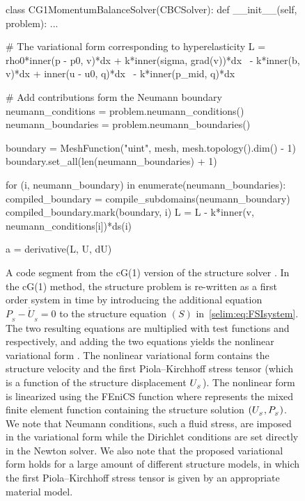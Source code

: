 \begin{figure}[tbp!]
\begin{python}
class CG1MomentumBalanceSolver(CBCSolver):
    def __init__(self, problem):
        ...

        # The variational form corresponding to hyperelasticity
        L = rho0*inner(p - p0, v)*dx + k*inner(sigma, grad(v))*dx \
          - k*inner(b, v)*dx + inner(u - u0, q)*dx \
          - k*inner(p_mid, q)*dx

        # Add contributions form the Neumann boundary
        neumann_conditions = problem.neumann_conditions()
        neumann_boundaries = problem.neumann_boundaries()

        boundary = MeshFunction("uint", mesh, mesh.topology().dim() - 1)
        boundary.set_all(len(neumann_boundaries) + 1)

        for (i, neumann_boundary) in enumerate(neumann_boundaries):
            compiled_boundary = compile_subdomains(neumann_boundary)
            compiled_boundary.mark(boundary, i)
            L = L - k*inner(v, neumann_conditions[i])*ds(i)

        a = derivative(L, U, dU)
\end{python}
\caption{A code segment from the cG(1) version of the structure
  solver . In the cG(1) method, the structure problem
  is re-written as a first order system in time by introducing the
  additional equation $P_{_{S}} - \dot{U}_{_{S}} = 0$ to the structure
  equation $(S)$ in~\eqref{selim:eq:FSIsystem}. The two resulting
  equations are multiplied with test functions \emp{v} and \emp{q}
  respectively, and adding the two equations yields the nonlinear
  variational form \emp{L}. The nonlinear variational form 
  contains the structure velocity \emp{p} and the first
  Piola--Kirchhoff stress tensor \emp{sigma} (which is a function of
  the structure displacement $U_{_{S}}$).  The nonlinear form \emp{L} is
  linearized using the FEniCS function \emp{derivative} where \emp{U}
  represents the mixed finite element function containing the structure
  solution $(U_{_{S}}, P_{_{S}})$.  We note that Neumann conditions, such a
  fluid stress, are imposed in the variational form \emp{L} while the
  Dirichlet conditions are set directly in the Newton solver. We also
  note that the proposed variational form holds for a large amount of
  different structure models, in which the first Piola--Kirchhoff stress
  tensor \emp{sigma} is given by an appropriate material model.  }
\label{selim:fig:structuresolver}
\end{figure}


